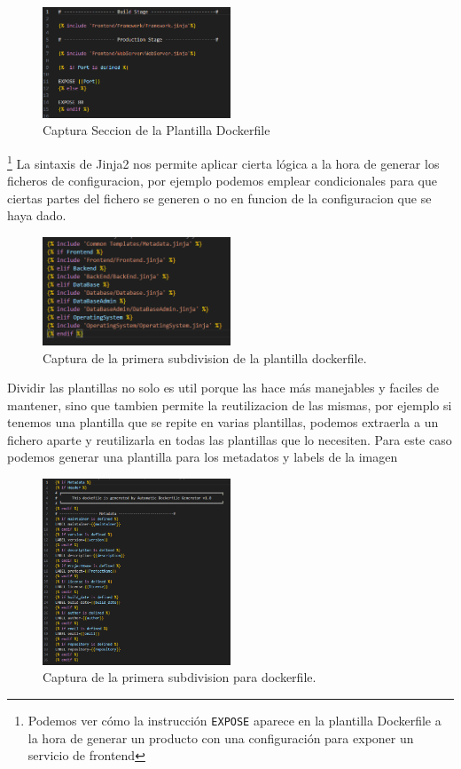 \documentclass[12pt, a4paper, twoside]{article}
\begin{document}
\begin{figure}[h]
	\centering
	  \includegraphics[width=0.5\textwidth]{dockerfile.frontend.jinja.template.png}
	\caption{Captura Seccion de la Plantilla Dockerfile}   
\end{figure}
\footnote{Podemos ver cómo la instrucción \texttt{EXPOSE} aparece en la plantilla Dockerfile a la hora de generar un producto con una configuración para exponer un servicio de frontend} 
La sintaxis de Jinja2 nos permite aplicar cierta lógica a la hora de generar los ficheros de configuracion, por ejemplo podemos emplear condicionales para que ciertas partes del fichero se generen o no en funcion de la configuracion que se haya dado.
\begin{figure}[h]
	\centering
	  \includegraphics[width=0.5\textwidth]{dockerfile.logica.plantillas.jinja.png}
	\caption{Captura de la primera subdivision de la plantilla dockerfile.}
\end{figure}

\newpage
Dividir las plantillas no solo es util porque las hace más manejables y faciles de mantener, sino que tambien permite la reutilizacion de las mismas, por ejemplo si tenemos una plantilla que se repite en varias plantillas, podemos extraerla a un fichero aparte y reutilizarla en todas las plantillas que lo necesiten.
Para este caso podemos generar una plantilla para los metadatos y labels de la imagen 

\begin{figure}[h]
	\centering
	  \includegraphics[width=0.5\textwidth]{dockerfile.metadata.png}
	\caption{Captura de la primera subdivision para dockerfile.}
\end{figure}
\end{document}
